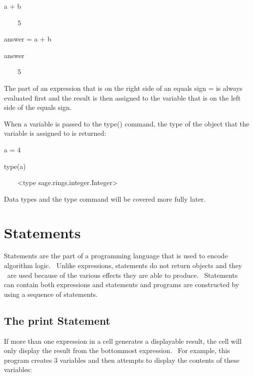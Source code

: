 \documentclass[12pt,twoside]{book}
\begin{document}
\bigskip

a + b

{\textbar}

\ \ \ \ 5


\bigskip

answer = a + b

{\textbar}


\bigskip

answer

{\textbar}

\ \ \ \ 5


\bigskip

The part of an expression that is on the right side of an equals sign
{\textquotesingle}={\textquotesingle} is always evaluated first and the
result is then assigned to the variable that is on the left side of the
equals sign.


\bigskip

When a variable is passed to the type() command, the type of the object
that the variable is assigned to is returned:


\bigskip

a = 4

type(a)

{\textbar}

\ \ \ \ {\textless}type
{\textquotesingle}sage.rings.integer.Integer{\textquotesingle}{\textgreater}


\bigskip

Data types and the type command will be covered more fully later.

\section[Statements]{Statements}
Statements are the part of a programming language that is used to encode
algorithm logic. \ Unlike expressions, statements do not return objects
and they \ are used because of the various effects they are able to
produce. \ Statements can contain both expressions and statements and
programs are constructed by using a sequence of statements.

\subsection[The print Statement]{The print Statement}

If more than one expression in a cell generates a displayable result,
the cell will only display the result from the bottommost expression.
\ For example, this program creates 3 variables and then attempts to
display the contents of these variables:
\end{document}
